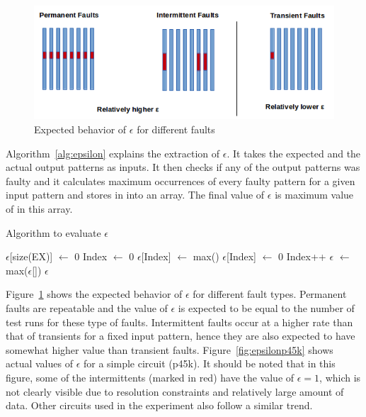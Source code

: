 \begin{figure}[h]
  \begin{center}
    \captionsetup{justification=centering}
    \includegraphics[scale=0.65]{figures/epsilon.png}
    \caption{Expected behavior of $\epsilon$ for different faults}
    \label{fig:epsilon}
  \end{center}
\end{figure}

Algorithm~\ref{alg:epsilon} explains the extraction of $\epsilon$. It takes the expected and the actual output patterns as inputs. It then checks if any of the output patterns was faulty and it calculates maximum occurrences of every faulty pattern for a given input pattern and stores in into an array. The final value of $\epsilon$ is maximum value of in this array.

\begin{algorithm}[H]
  \caption{Algorithm to evaluate $\epsilon$}
  \label{alg:epsilon}
  \begin{algorithmic}
 \State $\epsilon$[size(EX)] $\leftarrow$ 0\;
 \State Index $\leftarrow$ 0\;
   \State $\epsilon$[Index] $\leftarrow$ max()\;
  \Else
   \State $\epsilon$[Index] $\leftarrow$ 0\;
  \EndIf
  \State Index++\;
 \EndWhile
 \State$\epsilon$ $\leftarrow$ max($\epsilon$[])\;
 \State \Return $\epsilon$\;
 \EndProcedure
 \end{algorithmic}
\end{algorithm}

Figure~\ref{fig:epsilon} shows the expected behavior of $\epsilon$ for different fault types. Permanent faults are repeatable and the value of $\epsilon$ is expected to be equal to the number of test runs for these type of faults. Intermittent faults occur at a higher rate than that of transients for a fixed input pattern, hence they are also expected to have somewhat higher value than transient faults. Figure~\ref{fig:epsilonp45k} shows actual values of $\epsilon$ for a simple circuit (p45k). It should be noted that in this figure, some of the intermittents (marked in red) have the value of $\epsilon = 1$, which is not clearly visible due to resolution constraints and relatively large amount of data. Other circuits used in the experiment also follow a similar trend.

